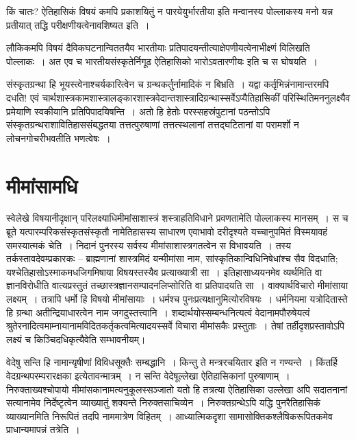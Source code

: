 किं चातः? ऐतिहासिकं विषयं कमपि प्रकाशयितुं न पारयेयुर्भारतीया इति मन्वानस्य पोल्लाकस्य
 मनो यन्न प्रतीयात् तद्धि परीक्षणीयत्वेनावशिष्यत इति~।

लौकिकमपि विषयं दैविकघटनान्विततयैव भारतीयाः प्रतिपादयन्तीत्याक्षेपणीयत्वेनाभीक्ष्णं विलिखति पोल्लाकः~। अत एव च भारतीयसंस्कृतेर्निगूढ ऐतिहासिको भारोऽवतारणीयः इति च स घोषयति~।

संस्कृतग्रन्था हि भूयस्त्वेनाश्चर्यकारित्वेन च ग्रन्थकर्तुर्नामादिकं न बिभ्रति~। यद्वा कर्तृभिन्नं\break नामान्तरमपि दधति! एवं चार्थशास्त्रकामशास्त्रालङ्कारशास्त्रवेदान्तशास्त्रादिग्रन्थास्सर्वेऽप्यैतिहासिकीं परिस्थितिमननुलक्ष्यैव प्रमेयाणि स्वकीयानि प्रतिपिपादयिषन्ति~। अतो हि हेतोः परस्सहस्रं\break पुटानां पठन्तोऽपि संस्कृतग्रन्थराशावितिहाससंबद्धतया तत्तत्पुरुषाणां तत्तत्स्थलानां तत्तद्घटितानां वा परामर्शो न लोचनगोचरीभवतीति भणत्वेषः~।


\section*{मीमांसामधि}

स्वेलेखे विषयानीदृक्षान् परिलक्ष्याधिमीमांसाशास्त्रं शस्त्राहतिविधाने प्रवणतामेति पोल्लाकस्य मानसम्~। स च ब्रूते यत्पारम्परिकसंस्कृतसंस्कृतौ नामेतिहासस्य साधारण एवाभावो दरीदृश्यते यच्चानुपमितं विस्मयावहं समस्यात्मकं चेति~। निदानं पुनरस्य सर्वस्य मीमांसाशास्त्रगतत्वेन स विभावयति~। तस्य तर्कस्तावदेवम्प्रकारकः – ब्राह्मणानां शास्त्रमिदं यन्मीमांसा नाम, सांस्कृतिकान्विधिनिषेधांश्च सैव विदधाति; यश्चेतिहासोऽस्माकमधजिगमिषाया विषयस्तस्यैव प्रत्याख्यात्री सा~। इतिहासाध्ययनमेव व्यर्थमिति वा ज्ञानविरोधीति वात्यप्रस्तुतं तच्छास्त्रज्ञानसम्पादनलिप्सोरिति वा प्रतिपादयति सा~। वाक्यार्थविचारो मीमांसाया लक्ष्यम्~। तत्रापि धर्मो हि विषयो मीमांसायाः~। धर्मश्च पुनःप्रत्यक्षानुमित्योरविषयः~। धर्मनियमा यत्रोदितास्ते हि ग्रन्था अतीन्द्रियाधारत्वेन नाम जगदुस्तत्त्वानि~। शब्दार्थयोस्सम्बन्धनित्यत्वं वेदानामपौरुषेयत्वं श्रुतेरनादित्वमाम्नायानामविदितकर्तृकत्वमित्यादयस्सर्वे विचारा मीमांसकैः प्रस्तुताः~। तेषां तर्हीदृशप्रस्तावोऽपि लक्ष्यं च किञ्चिदधिकृत्यैवेति सम्भावनीयम्।

वेदेषु सन्ति हि नामान्यृषीणां विविधसूक्तैः सम्बद्धानि~। किन्तु ते मन्त्ररचयितार इति न गण्यन्ते~। किंतर्हि वेदग्रन्थपरम्परारक्षका इत्येतावन्मात्रम्~। न सन्ति वेदेषूल्लेखा ऐतिहासिकानां पुरुषाणाम्~। निरुक्ताख्यश्चोपायो मीमांसकानामत्यनुकूलस्सञ्जातो यतो हि तत्रत्या ऐतिहासिका उल्लेखा अपि सदातनानां सत्यानामेव निर्देष्टृत्वेन व्याख्यातुं शक्यन्ते निरुक्तसाचिव्येन~।
 निरुक्तग्रन्थेऽपि यद्धि पुनरैतिहासिकं व्याख्यानमिति निरूपितं तदपि नाममात्रेण विहितम्~। आध्यात्मिकदृशा सामासोक्तिकश्लैषिकरूपितकमेव प्राधान्यमापन्नं तत्रेति~।

